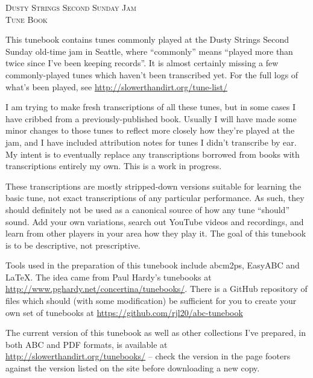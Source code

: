 \begin{titlepage}
\begin{center}

\textsc{\Large Dusty Strings Second Sunday Jam}\\[0.5cm]
\textsc{\LARGE Tune Book}\\[1cm]


\begin{minipage}{6in}
\setlength{\parindent}{15pt} %
\setlength{\parskip}{1em plus.4em minus.3em}

This tunebook contains tunes commonly played at the Dusty Strings
Second Sunday old-time jam in Seattle, where ``commonly'' means
``played more than twice since I've been keeping records''. It is
almost certainly missing a few commonly-played tunes which haven't
been transcribed yet. For the full logs of what's been played, see
\url{http://slowerthandirt.org/tune-list/}

I am trying to make fresh transcriptions of all these tunes, but in
some cases I have cribbed from a previously-published book. Usually I
will have made some minor changes to those tunes to reflect more
closely how they're played at the jam, and I have included attribution
notes for tunes I didn't transcribe by ear. My intent is to eventually
replace any transcriptions borrowed from books with transcriptions
entirely my own. This is a work in progress.

These transcriptions are mostly stripped-down versions suitable for
learning the basic tune, not exact transcriptions of any particular
performance. As such, they should definitely not be used as a
canonical source of how any tune ``should'' sound. Add your own
variations, search out YouTube videos and recordings, and learn from
other players in your area how they play it. The goal of this tunebook
is to be descriptive, not prescriptive.

Tools used in the preparation of this tunebook include abcm2ps,
EasyABC and {\LaTeX}. The idea came from Paul Hardy's tunebooks at
\url{http://www.pghardy.net/concertina/tunebooks/}.  There is a GitHub
repository of files which should (with some modification) be
sufficient for you to create your own set of tunebooks at
\url{https://github.com/rjl20/abc-tunebook}

The current version of this tunebook as well as other collections I've
prepared, in both ABC and PDF formats, is available at
\url{http://slowerthandirt.org/tunebooks/} -- check the version in the
page footers against the version listed on the site before downloading
a new copy.




\end{minipage}
\end{center}
\end{titlepage}
